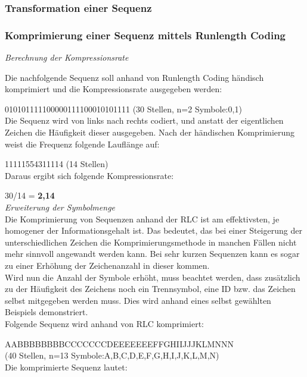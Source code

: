 \documentclass[12pt,german]{article}
\begin{document}
\subsubsection{Transformation einer Sequenz}

\subsubsection{Komprimierung einer Sequenz mittels Runlength Coding}
\textit{Berechnung der Kompressionsrate} 

Die nachfolgende Sequenz soll anhand von Runlength Coding händisch komprimiert und die Kompressionsrate ausgegeben werden:

010101111100000111100010101111 (30 Stellen, n=2 Symbole:0,1) \\

Die Sequenz wird von links nach rechts codiert, und anstatt der eigentlichen Zeichen die Häufigkeit dieser ausgegeben. Nach der händischen Komprimierung weist die Frequenz folgende Lauflänge auf:

11111554311114 (14 Stellen)\\


Daraus ergibt sich folgende Kompressionsrate:

30/14 = \textbf{ 2,14}\\

\textit{Erweiterung der Symbolmenge}\\
Die Komprimierung von Sequenzen anhand der RLC ist am effektivsten, je homogener der Informationsgehalt ist. Das bedeutet, das bei einer Steigerung der unterschiedlichen Zeichen die Komprimierungsmethode in manchen Fällen nicht mehr sinnvoll angewandt werden kann. Bei sehr kurzen Sequenzen kann es sogar zu einer Erhöhung der Zeichenanzahl in dieser kommen.\\

Wird nun die Anzahl der Symbole erhöht, muss beachtet werden, dass zusätzlich zu der Häufigkeit des Zeichens noch ein Trennsymbol, eine ID bzw. das Zeichen selbst mitgegeben werden muss. Dies wird anhand eines selbst gewählten Beispiels demonstriert.\\

Folgende Sequenz wird anhand von RLC komprimiert:

AABBBBBBBBCCCCCCCDEEEEEEEFFGHIIJJJKLMNNN\\ (40 Stellen, n=13 Symbole:A,B,C,D,E,F,G,H,I,J,K,L,M,N)\\

Die komprimierte Sequenz lautet:
\end{document}
